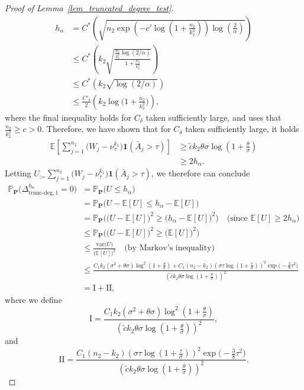 \documentclass{article}
\newcommand{\bbP}{\mathbb{P}}
\newcommand{\bP}{\mathbf{P}}
\newcommand{\EE}{\mathbb{E}}
\newcommand{\var}{\textrm{var}}
\newcommand{\one}{\mathbf{1}}
\newcommand{\chisqlin}{\text{trunc-deg}}
\begin{document}
\begin{proof}[Proof of Lemma~\ref{lem_truncated_degree_test}]
\begin{align*}
h_\alpha &= C^*\left(\sqrt{n_2\exp\left(-c' \log(1 + \frac{n_2}{k_2^2})\right)\log\left(\frac{2}{\alpha}\right)}\right) \\
&\leq C^*\left(k_2\sqrt{\frac{\frac{n_2}{k_2^2}\log(2/\alpha)}{1 + \frac{n_2}{k_2^2}}}\right) \\
&\leq C^* \left(k_2\sqrt{\log(2/\alpha)} \right) \\
&\leq \frac{C'_\delta}{2} \left(k_2 \log\Big(1 + \frac{n_2}{k_2^2}\Big)\right),
\end{align*}
where the final inequality holds for $C_\delta$ taken sufficiently large, and uses that $\frac{n_2}{k_2^2} \geq c > 0$. Therefore, we have shown that for $C_\delta$ taken sufficiently large, it holds
\begin{align*}
    \EE\left[\sum_{j = 1}^{n_2}\big(W_{j} - \nu^{k_1}_{\tau}\big)\one(\bar{A}_j > \tau)\right] &\geq \tilde{c}k_2\theta \sigma \log\left(1 + \frac{\theta}{\sigma}\right) \\
    &\geq 2h_\alpha.
\end{align*}
Letting $U_ := \sum_{j = 1}^{n_2}\big(W_{j} - \nu^{k_1}_{\tau}\big)\one(\bar{A}_{j} > \tau)$, we therefore can conclude
\begin{align*}
\bbP_{\bP}\big(\Delta^{h_\alpha}_{\chisqlin, 1} = 0\big) &= \bbP_{\bP}\big(U \leq h_\alpha\big)\\
    &= \bbP_{\bP}\big(U - \EE[U]\leq h_\alpha - \EE[U]\big) \\
    &=\bbP_{\bP}\Big(\big(U - \EE[U]\big)^2\geq \big(h_\alpha - \EE[U]\big)^2\Big) \quad \text{(since $\EE[U] \geq 2h_\alpha$)} \\
    &\leq \bbP_{\bP}\Big(\big(U - \EE[U]\big)^2\geq \big(\EE[U]\big)^2\Big) \\
    &\leq \frac{\var\big(U\big)}{\big(\EE[U]\big)^2} \quad \text{(by Markov's inequality)} \\
    &\leq \frac{C_1 k_2 (\sigma^2 + \theta \sigma) \log^2\left(1 + \frac{\theta}{\sigma}\right) + C_1 (n_2 - k_2)\left(\sigma \tau \log(1 + \frac{\tau}{\sigma})\right)^2\exp\big(-\frac38 \tau^2\big)}{\left(\tilde{c}k_2\theta \sigma \log\left(1 + \frac{\theta}{\sigma}\right)\right)^2} \\
    &= \text{I} + \text{II},
\end{align*}
where we define
\[\text{I} = \frac{C_1 k_2 (\sigma^2 + \theta \sigma) \log^2\left(1 + \frac{\theta}{\sigma}\right)}{\left(\tilde{c}k_2\theta \sigma \log\left(1 + \frac{\theta}{\sigma}\right)\right)^2},\]
and 
\[\text{II} = \frac{C_1 (n_2 - k_2)\left(\sigma \tau \log(1 + \frac{\tau}{\sigma})\right)^2\exp\big(-\frac38 \tau^2\big)}{\left(\tilde{c}k_2\theta \sigma \log\left(1 + \frac{\theta}{\sigma}\right)\right)^2}.\]

\end{proof}
\end{document}
